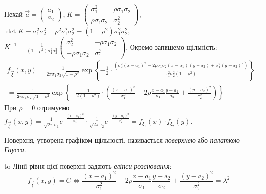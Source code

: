 Нехай $\vec{a} = \begin{pmatrix}
    a_1 \\ a_2
\end{pmatrix}$, $K = \begin{pmatrix}
    \sigma_1^2 & \rho \sigma_1 \sigma_2 \\
    \rho \sigma_1 \sigma_2 & \sigma_2^2
\end{pmatrix}$, $\det{K} = \sigma_1^2 \sigma_2^2 - \rho^2 \sigma_1^2 \sigma_2^2 = (1-\rho^2)\sigma_1^2\sigma_2^2$, 
$K^{-1} = \frac{1}{(1-\rho^2)\sigma_1^2\sigma_2^2}\begin{pmatrix}
    \sigma_2^2 & -\rho \sigma_1 \sigma_2 \\
    -\rho \sigma_1 \sigma_2 & \sigma_1^2
\end{pmatrix}$.
Окремо запишемо щільність:
\begin{equation}
    \begin{gathered}
        f_{\vec{\xi}}(x,y) = \frac{1}{2\pi\sigma_1\sigma_2\sqrt{1-\rho^2}} \exp\left\{-\frac{1}{2}\cdot
        \frac{\left( \sigma_2^2(x-a_1)^2 - 2\rho\sigma_1\sigma_2(x-a_1)(y-a_2) + \sigma_1^2(y-a_2)^2\right)}{\sigma_1^2\sigma_2^2(1-\rho^2)}
        \right\} = \\
        = \frac{1}{2\pi\sigma_1\sigma_2\sqrt{1-\rho^2}} \exp\left\{
            -\frac{1}{2(1-\rho^2)}\cdot
            \left(\frac{(x-a_1)^2}{\sigma_1^2} -
            2\rho\frac{x-a_1}{\sigma_1}\frac{y-a_2}{\sigma_2} +
            \frac{(y-a_2)^2}{\sigma_2^2}
            \right) 
        \right\}
    \end{gathered}
\end{equation}
При $\rho = 0$ отримуємо $f_{\vec{\xi}}(x,y) = \frac{1}{\sqrt{2\pi}\sigma_1} e^{-\frac{(x-a_1)^2}{\sigma_1^2}} \cdot \frac{1}{\sqrt{2\pi}\sigma_2} e^{-\frac{(y-a_2)^2}{\sigma_2^2}} = f_{\xi_1}(x)\cdot f_{\xi_2}(y)$.

Поверхня, утворена графіком щільності,
називається \emph{поверхнею} або \emph{палаткою Гаусса}.
 
\hbox to 
Лінії рівня цієї поверхні задають \emph{еліпси розсіювання}:
$$f_{\vec{\xi}}(x,y) = C \Leftrightarrow \frac{(x-a_1)^2}{\sigma_1^2} -
2\rho\frac{x-a_1}{\sigma_1}\frac{y-a_2}{\sigma_2} +
\frac{(y-a_2)^2}{\sigma_2^2} = \lambda^2$$


